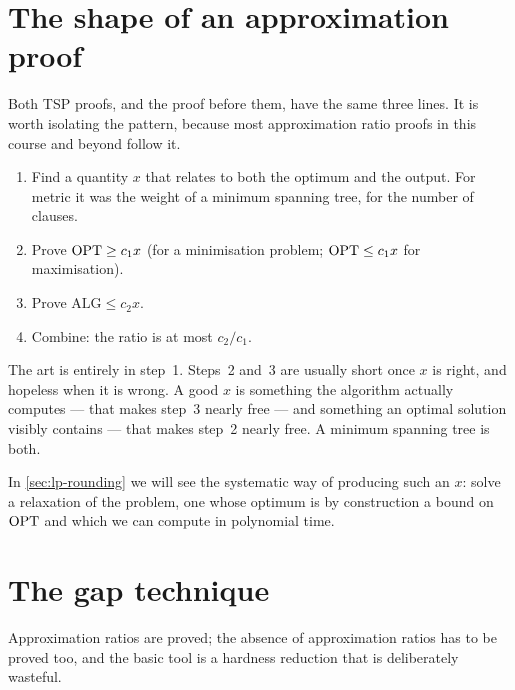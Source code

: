 \section{The shape of an approximation proof}
\label{sec:approx-proof-shape}

Both TSP proofs, and the  proof before them, have the same three
lines. It is worth isolating the pattern, because most approximation ratio
proofs in this course and beyond follow it.

\begin{enumerate}[leftmargin=*]
  \item Find a quantity $x$ that relates to both the optimum and the output.
        For metric  it was the weight of a minimum spanning tree, for
         the number of clauses.
  \item Prove $\mathrm{OPT} \ge c_1 x$ (for a minimisation problem; $\mathrm{OPT} \le c_1 x$
        for maximisation).
  \item Prove $\mathrm{ALG} \le c_2 x$.
  \item Combine: the ratio is at most $c_2/c_1$.
\end{enumerate}

The art is entirely in step~1. Steps~2 and~3 are usually short once $x$ is
right, and hopeless when it is wrong. A good $x$ is something the algorithm
actually computes --- that makes step~3 nearly free --- and something an
optimal solution visibly contains --- that makes step~2 nearly free. A minimum
spanning tree is both.

In \cref{sec:lp-rounding} we will see the systematic way of producing such an
$x$: solve a relaxation of the problem, one whose optimum is by construction a
bound on $\mathrm{OPT}$ and which we can compute in polynomial time.

\section{The gap technique}
\label{sec:gap-technique}

Approximation ratios are proved; the absence of approximation ratios has to be
proved too, and the basic tool is a hardness reduction that is deliberately
wasteful.

